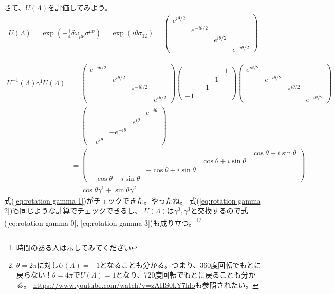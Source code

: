 \documentclass[10pt,a4paper]{jarticle}
\begin{document}
%
さて、$U(\Lambda)$を評価してみよう。
\begin{align}
U(\Lambda)
=
\exp\left( -\frac{i}{4} \delta\omega_{\mu\nu} \sigma^{\mu\nu} \right)
=
\exp\left( i \theta \sigma_{12} \right)
=
\left(\begin{array}{cccc}
e^{i\theta/2} &&& \\
& e^{-i\theta/2} && \\
&& e^{i\theta/2} & \\
&&& e^{-i\theta/2} 
\end{array}\right)
\end{align}
%

\begin{align}
U^{-1}(\Lambda) \gamma^1 U(\Lambda)
&=
\left(\begin{array}{cccc}
e^{-i\theta/2} &&& \\
& e^{i\theta/2} && \\
&& e^{-i\theta/2} & \\
&&& e^{i\theta/2} 
\end{array}\right)
%
\left(\begin{array}{cccc}
&&&1\\
&&1&\\
&-1&&\\
-1&&&
\end{array}\right)
%
\left(\begin{array}{cccc}
e^{i\theta/2} &&& \\
& e^{-i\theta/2} && \\
&& e^{i\theta/2} & \\
&&& e^{-i\theta/2} 
\end{array}\right) \nonumber\\
%
&=
\left(\begin{array}{cccc}
&&&e^{-i\theta}\\
&&e^{i\theta}&\\
&-e^{-i\theta}&&\\
-e^{i\theta}&&&
\end{array}\right) \nonumber\\
&=
\left(\begin{array}{cccc}
&&& \cos\theta - i\sin\theta \\
&&\cos\theta + i\sin\theta&\\
&-\cos\theta + i\sin\theta&&\\
-\cos\theta - i\sin\theta&&&
\end{array}\right) \nonumber\\
&=
\cos\theta \gamma^1 + \sin\theta \gamma^2
\end{align}
式(\ref{eq:rotation gamma 1})がチェックできた。やったね。
式(\ref{eq:rotation gamma 2})も同じような計算でチェックできるし、
$U(\Lambda)$は$\gamma^0, \gamma^3$と交換するので式(\ref{eq:rotation gamma 0}, \ref{eq:rotation gamma 3})も成り立つ。\footnote{時間のある人は示してみてください}\footnote{
$\theta = 2\pi$に対し$U(\Lambda) = -1$となることも分かる。つまり、360度回転でもとに戻らない！$\theta = 4\pi$で$U(\Lambda) = 1$となり、720度回転でもとに戻ることも分かる。
\url{https://www.youtube.com/watch?v=zAHS0kY7hlo}も参照されたい。
}
\end{document}
